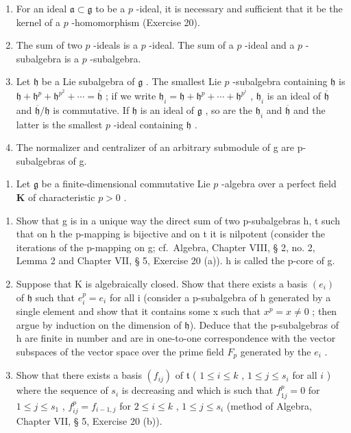\begin{enumerate}
\def\labelenumi{(\alph{enumi})}
\item
  For an ideal \(\mathfrak{a} \subset \mathfrak{g}\) to be a \(p\) -ideal, it is necessary and sufficient that it be the kernel of a \(p\) -homomorphism (Exercise 20).
\item
  The sum of two \(p\) -ideals is a \(p\) -ideal. The sum of a \(p\) -ideal and a \(p\) -subalgebra is a \(p\) -subalgebra.
\item
  Let \(\mathfrak{h}\) be a Lie subalgebra of \(\mathfrak{g}\) . The smallest Lie \(p\) -subalgebra containing \(\mathfrak{h}\) is \(\mathfrak{h} + \mathfrak{h}^p + \mathfrak{h}^{p^2} + \cdots = \overline{\mathfrak{h}}\) ; if we write \(\mathfrak{h}_i = \mathfrak{h} + \mathfrak{h}^p + \cdots + \mathfrak{h}^{p^i}\) , \(\mathfrak{h}_i\) is an ideal of \(\overline{\mathfrak{h}}\) and \(\overline{\mathfrak{h}}/\mathfrak{h}\) is commutative. If \(\mathfrak{h}\) is an ideal of \(\mathfrak{g}\) , so are the \(\mathfrak{h}_i\) and \(\overline{\mathfrak{h}}\) and the latter is the smallest \(p\) -ideal containing \(\mathfrak{h}\) .
\item
  The normalizer and centralizer of an arbitrary submodule of g are p-subalgebras of g.
\end{enumerate}

\begin{enumerate}
\def\labelenumi{\arabic{enumi}.}
\setcounter{enumi}{22}
\tightlist
\item
  Let \(\mathfrak{g}\) be a finite-dimensional commutative Lie \(p\) -algebra over a perfect field \(\mathbf{K}\) of characteristic \(p > 0\) .
\end{enumerate}

\begin{enumerate}
\def\labelenumi{(\alph{enumi})}
\item
  Show that g is in a unique way the direct sum of two p-subalgebras h, t such that on h the p-mapping is bijective and on t it is nilpotent (consider the iterations of the p-mapping on g; cf.~Algebra, Chapter VIII, § 2, no. 2, Lemma 2 and Chapter VII, § 5, Exercise 20 (a)). h is called the p-core of g.
\item
  Suppose that K is algebraically closed. Show that there exists a basis \((e_{i})\) of \(\mathfrak{h}\) such that \(e_{i}^{p}=e_{i}\) for all i (consider a p-subalgebra of h generated by a single element and show that it contains some x such that \(x^{p}=x\neq0\) ; then argue by induction on the dimension of \(\mathfrak{h}\)). Deduce that the p-subalgebras of h are finite in number and are in one-to-one correspondence with the vector subspaces of the vector space over the prime field \(F_{p}\) generated by the \(e_{i}\) .
\item
  Show that there exists a basis \((f_{ij})\) of \(\mathfrak{t}\) ( \(1 \leqslant i \leqslant k\) , \(1 \leqslant j \leqslant s_i\) for all \(i\) ) where the sequence of \(s_i\) is decreasing and which is such that \(f_{1j}^p = 0\) for \(1 \leqslant j \leqslant s_1\) , \(f_{ij}^p = f_{i-1,j}\) for \(2 \leqslant i \leqslant k\) , \(1 \leqslant j \leqslant s_i\) (method of Algebra, Chapter VII, § 5, Exercise 20 (b)).
\end{enumerate}

